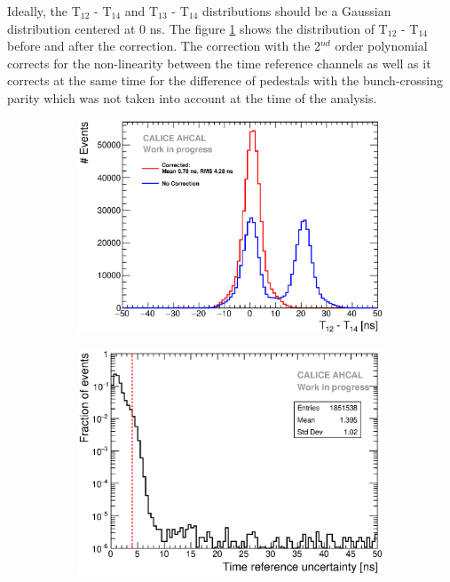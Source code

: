 \documentclass{JINST}
\begin{document}
Ideally, the T$_{12}$ - T$_{14}$ and T$_{13}$ - T$_{14}$ distributions should be a Gaussian distribution centered at 0 ns. The figure \ref{fig:T0Corr} shows the distribution of T$_{12}$ - T$_{14}$ before and after the correction. The correction with the 2$^{nd}$ order polynomial corrects for the non-linearity between the time reference channels as well as it corrects at the same time for the difference of pedestals with the bunch-crossing parity which was not taken into account at the time of the analysis.

\begin{figure}[htbp!]
  \begin{subfigure}[t]{0.49\textwidth}
    \centering
    \includegraphics[width=1\linewidth]{fig/T0_Resolution_5.eps}
    \caption{} \label{fig:T0Corr}
  \end{subfigure}
  \hfill
  \begin{subfigure}[t]{0.49\textwidth}
    \centering
    \includegraphics[width=1\linewidth]{fig/T0ReferenceError.eps}

\end{subfigure}
\end{figure}
\end{document}

